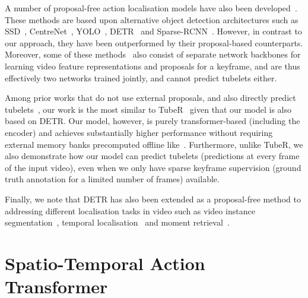 \documentclass[10pt,twocolumn,letterpaper]{article}
\begin{document}
A number of proposal-free action localisation models have also been developed~\cite{kopuklu2019you, chen2021watch, sun_eccv_2018, girdhar_cvpr_2019, kalogeiton_iccv_2017, zhao2022tuber}.
These methods are based upon alternative object detection architectures such as SSD~\cite{liu_ssd_eccv_2016}, CentreNet~\cite{zhou2019objects}, YOLO~\cite{redmon2016you}, DETR~\cite{carion_eccv_2020} and Sparse-RCNN~\cite{sun2021sparse}.
However, in contrast to our approach, they have been outperformed by their proposal-based counterparts.
Moreover, some of these methods~\cite{kopuklu2019you, girdhar_cvpr_2019, sun_eccv_2018} also consist of separate network backbones for learning video feature representations and proposals for a keyframe, and are thus effectively two networks trained jointly, and cannot predict tubelets either. 

Among prior works that do not use external proposals, and also directly predict tubelets~\cite{kalogeiton_iccv_2017,li2020actions,song2019tacnet,li2018recurrent,singh_iccv_2017,zhao2022tuber}, our work is the most similar to TubeR~\cite{zhao2022tuber} given that our model is also based on DETR.
Our model, however, is purely transformer-based (including the encoder) and achieves substantially higher performance without requiring external memory banks precomputed offline like~\cite{zhao2022tuber}.
Furthermore, unlike TubeR, we also demonstrate how our model can predict tubelets (\ie predictions at every frame of the input video), even when we only have sparse keyframe supervision (\ie ground truth annotation for a limited number of frames) available. 

Finally, we note that DETR has also been extended as a proposal-free method to addressing different localisation tasks in video such as video instance segmentation~\cite{wang2021end}, temporal localisation~\cite{liu2022end,zhang2021temporal,nawhal2021activity} and moment retrieval~\cite{lei2021detecting}. 



 \section{Spatio-Temporal Action Transformer}
\label{sec:method}
\end{document}
